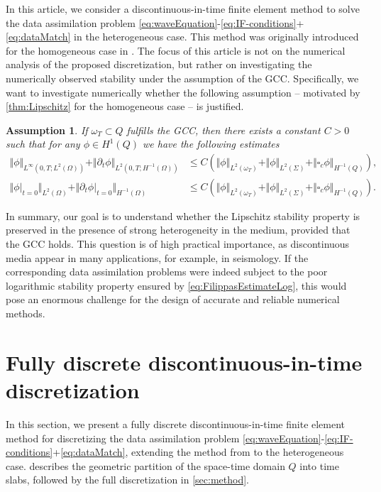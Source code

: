 \documentclass[sn-mathphys-num]{sn-jnl}
\newtheorem{assum}{Assumption}
\numberwithin{equation}{section}
\newcommand{\dt}{\partial_t}
\begin{document}
In this article, we consider a discontinuous-in-time finite element method to solve the data assimilation problem \eqref{eq:waveEquation}-\eqref{eq:IF-conditions}+\eqref{eq:dataMatch} in the heterogeneous case. This method was originally introduced for the homogeneous case in \cite{BP24}. The focus of this article is not on the numerical analysis of the proposed discretization, but rather on investigating the numerically observed stability under the assumption of the GCC. Specifically, we want to investigate numerically whether the following assumption -- motivated by \cref{thm:Lipschitz} for the homogeneous case -- is justified. 

\begin{assum}\label{assum:LipschitzStability}
    If $\omega_T \subset Q$ fulfills the GCC, then there exists a constant $C > 0$ such that for any $\phi \in H^1(Q)$ we have the following estimates
    \begin{align*}
        \Vert \phi \Vert_{L^\infty(0,T;L^2(\Omega))} + \Vert \dt \phi \Vert_{L^2(0,T;H^{-1}(\Omega))} &\le C \left(  \Vert \phi \Vert_{L^2(\omega_T)} + \Vert \phi \Vert_{L^2(\Sigma)} + \Vert \square_c \phi \Vert_{H^{-1}(Q)} \right), \\
        \Vert \phi \vert_{t = 0} \Vert_{L^2(\Omega)} + \Vert \dt \phi \vert_{t = 0} \Vert_{H^{-1}(\Omega)} &\le C \left(\Vert \phi \Vert_{L^2(\omega_T)} + \Vert \phi \Vert_{L^2(\Sigma)} + \Vert \square_c \phi \Vert_{H^{-1}(Q)} \right). 
    \end{align*}
\end{assum}

In summary, our goal is to understand whether the Lipschitz stability property is preserved in the presence of strong heterogeneity in the medium, provided that the GCC holds. This question is of high practical importance, as discontinuous media appear in many applications, for example, in seismology. If the corresponding data assimilation problems were indeed subject to the poor logarithmic stability property ensured by \eqref{eq:FilippasEstimateLog}, this would pose an enormous challenge for the design of accurate and reliable numerical methods. 


\section{Fully discrete discontinuous-in-time discretization}\label{sec:discretization} 
In this section, we present a fully discrete discontinuous-in-time finite element method for discretizing the data assimilation problem \eqref{eq:waveEquation}-\eqref{eq:IF-conditions}+\eqref{eq:dataMatch}, extending the method from \cite{BP24} to the heterogeneous case.  describes the geometric partition of the space-time domain $Q$ into time slabs, followed by the full discretization in \cref{sec:method}.
\end{document}
